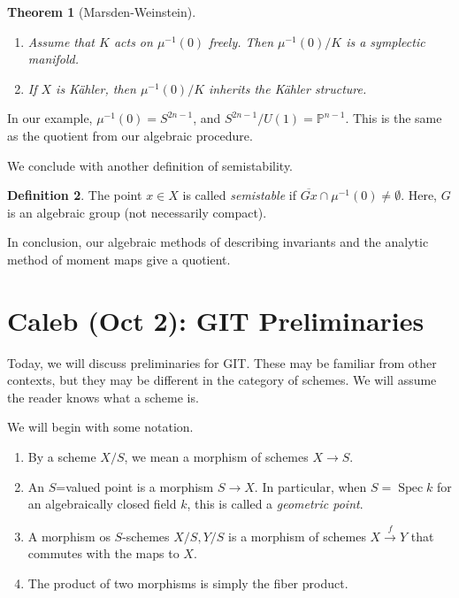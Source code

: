 \documentclass[leqno, openany]{memoir}
\newtheorem{thm}{Theorem}[section]
\theoremstyle{definition}
\newtheorem{defn}[thm]{Definition}
\theoremstyle{remark}
\theoremstyle{plain}
\theoremstyle{definition}
\theoremstyle{remark}
\renewcommand{\P}{\mathbb{P}}
\newcommand{\ol}[1]{\overline{#1}}
\DeclareMathOperator{\Spec}{Spec}
\begin{document}
\begin{thm}[Marsden-Weinstein]
    \begin{enumerate}
        \item Assume that $K$ acts on $\mu^{-1}(0)$ freely. Then $\mu^{-1}(0) / K$ is a symplectic manifold.
        \item If $X$ is K\"ahler, then $\mu^{-1}(0) / K$ inherits the K\"ahler structure.
    \end{enumerate}
\end{thm}

In our example, $\mu^{-1}(0) = S^{2n-1}$, and $S^{2n-1} / U(1) = \P^{n-1}$. This is the same as the quotient from our algebraic procedure.

We conclude with another definition of semistability.

\begin{defn}
    The point $x \in X$ is called \textit{semistable} if $\ol{Gx} \cap \mu^{-1}(0) \neq \emptyset$. Here, $G$ is an algebraic group (not necessarily compact). 
\end{defn}

In conclusion, our algebraic methods of describing invariants and the analytic method of moment maps give a quotient.

\chapter{Caleb (Oct 2): GIT Preliminaries}%
\label{cha:caleb_oct_2_git_preliminaries}

Today, we will discuss preliminaries for GIT. These may be familiar from other contexts, but they may be different in the category of schemes. We will assume the reader knows what a scheme is.

We will begin with some notation.
\begin{enumerate}
    \item By a scheme $X/S$, we mean a morphism of schemes $X \to S$.
    \item An $S$=valued point is a morphism $S \to X$. In particular, when $S = \Spec k$ for an algebraically closed field $k$, this is called a \textit{geometric point}.
    \item A morphism os $S$-schemes $X/S,Y/S$ is a morphism of schemes $X \xrightarrow{f} Y$ that commutes with the maps to $X$.
    \item The product of two morphisms is simply the fiber product.
\end{enumerate}
\end{document}

